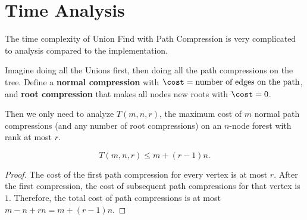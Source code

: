 \section{Time Analysis}

The time complexity of Union Find with Path Compression is very complicated to analysis compared to the implementation.

Imagine doing all the Unions first, then doing all the path compressions on the tree. Define a \textbf{normal compression} with $\cost = \text{number of edges on the path}$, and \textbf{root compression} that makes all nodes new roots with $\cost = 0$.

Then we only need to analyze $T(m,n,r)$, the maximum cost of $m$ normal path compressions (and any number of root compressions) on an $n$-node forest with rank at most $r$.

\begin{lemma}
	\[ T(m,n,r) \leq m + (r-1)n .\]\label{lemma:first}
\end{lemma}
\begin{proof}
	The cost of the first path compression for every vertex is at most $r$. After the first compression, the cost of subsequent path compressions for that vertex is $1$. Therefore, the total cost of path compressions is at most $m - n + rn = m+(r-1)n$.
\end{proof}

